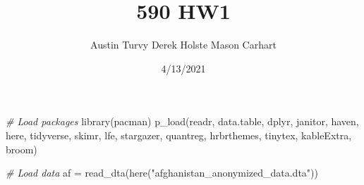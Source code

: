 \documentclass[
]{article}
\title{590 HW1}
\author{Austin Turvy Derek Holste Mason Carhart}
\date{4/13/2021}
\newenvironment{Shaded}{\begin{snugshade}}{\end{snugshade}}
\newcommand{\CommentTok}[1]{\textcolor[rgb]{0.56,0.35,0.01}{\textit{#1}}}
\newcommand{\FunctionTok}[1]{\textcolor[rgb]{0.00,0.00,0.00}{#1}}
\newcommand{\NormalTok}[1]{#1}
\newcommand{\OtherTok}[1]{\textcolor[rgb]{0.56,0.35,0.01}{#1}}
\newcommand{\StringTok}[1]{\textcolor[rgb]{0.31,0.60,0.02}{#1}}
\begin{document}
\maketitle

\begin{Shaded}
\begin{Highlighting}[]
\CommentTok{\# Load packages}
\FunctionTok{library}\NormalTok{(pacman)}
\FunctionTok{p\_load}\NormalTok{(readr, data.table, dplyr, janitor, haven, here, }
\NormalTok{       tidyverse, skimr, lfe, stargazer, quantreg, hrbrthemes, }
\NormalTok{       tinytex, kableExtra, broom)}
\end{Highlighting}
\end{Shaded}

\begin{Shaded}
\begin{Highlighting}[]
\CommentTok{\# Load data}
\NormalTok{af }\OtherTok{=} \FunctionTok{read\_dta}\NormalTok{(}\FunctionTok{here}\NormalTok{(}\StringTok{"afghanistan\_anonymized\_data.dta"}\NormalTok{)) }
\end{Highlighting}
\end{Shaded}
\end{document}
